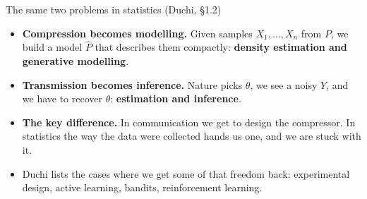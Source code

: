 \documentclass[aspectratio=169,9pt]{beamer}
\newcommand{\orange}[1]{\textcolor{AmazonOrange}{\textbf{#1}}}
\newcommand{\blue}[1]{\textcolor{densityblue}{\textbf{#1}}}
\newcommand{\muted}[1]{\textcolor{EPICMuted}{#1}}
\begin{document}
\begin{frame}{The same two problems in statistics \muted{(Duchi, \S1.2)}}
\begin{center}
\end{center}
\vspace{0.1cm}
\begin{itemize}
    \item \orange{Compression becomes modelling.} Given samples $X_1,\dots,X_n$ from $P$, we build a model
    $\widehat P$ that describes them compactly: \blue{density estimation and generative modelling}.
    \pause
    \item \orange{Transmission becomes inference.} Nature picks $\theta$, we see a noisy $Y$, and we have to
    recover $\theta$: \blue{estimation and inference}.
    \pause
    \item \orange{The key difference.} In communication we get to design the compressor. In statistics the way
    the data were collected hands us one, and we are stuck with it.
    \pause
    \item \muted{Duchi lists the cases where we get some of that freedom back: experimental design, active
    learning, bandits, reinforcement learning.}
\end{itemize}
\vspace{0.2cm}
\pause
{}
\end{frame}
\end{document}
